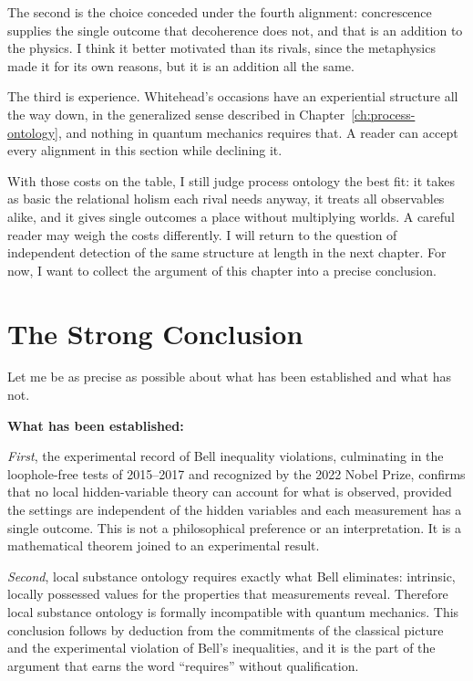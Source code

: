 The second is the choice conceded under the fourth alignment: concrescence
supplies the single outcome that decoherence does not, and that is an addition to
the physics.
I think it better motivated than its rivals, since the metaphysics made it for
its own reasons, but it is an addition all the same.

The third is experience.
Whitehead's occasions have an experiential structure all the way down, in the
generalized sense described in Chapter~\ref{ch:process-ontology}, and nothing in
quantum mechanics requires that.
A reader can accept every alignment in this section while declining it.

With those costs on the table, I still judge process ontology the best fit: it
takes as basic the relational holism each rival needs anyway, it treats all
observables alike, and it gives single outcomes a place without multiplying
worlds.
A careful reader may weigh the costs differently.
I will return to the question of independent detection of the same structure at
length in the next chapter.
For now, I want to collect the argument of this chapter into a precise conclusion.


\section{The Strong Conclusion}
\label{sec:ch5-conclusion}

Let me be as precise as possible about what has been established and what has not.

\textbf{What has been established:}

\emph{First}, the experimental record of Bell inequality violations, culminating in
the loophole-free tests of 2015--2017 and recognized by the 2022 Nobel Prize,
confirms that no local hidden-variable theory can account for what is observed,
provided the settings are independent of the hidden variables
and each measurement has a single outcome.
This is not a philosophical preference or an interpretation.
It is a mathematical theorem joined to an experimental result.

\emph{Second}, local substance ontology requires exactly what Bell eliminates:
intrinsic, locally possessed values for the properties that measurements reveal.
Therefore local substance ontology is formally incompatible with quantum mechanics.
This conclusion follows by deduction from the commitments of the classical
picture and the experimental violation of Bell's inequalities, and it is the part
of the argument that earns the word ``requires'' without qualification.

